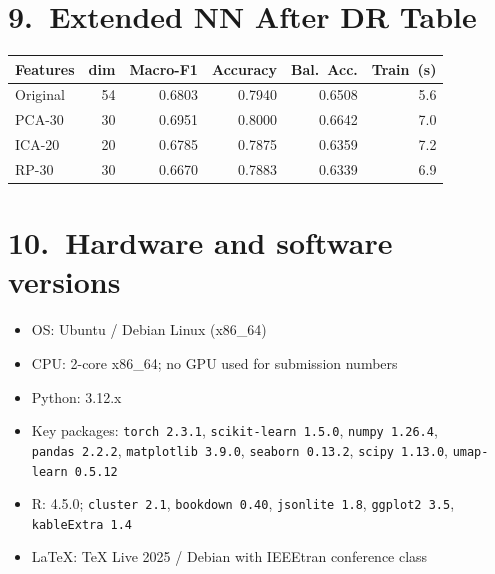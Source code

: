 \documentclass[11pt]{article}
\begin{document}
\section*{9.\ Extended NN After DR Table}

\begin{center}
\small
\begin{tabular}{lrrrrr}
\toprule
\textbf{Features} & \textbf{dim} & \textbf{Macro-F1} &
\textbf{Accuracy} & \textbf{Bal.~Acc.} & \textbf{Train~(s)} \\
\midrule
Original & 54 & 0.6803 & 0.7940 & 0.6508 & 5.6 \\
PCA-30   & 30 & 0.6951 & 0.8000 & 0.6642 & 7.0 \\
ICA-20   & 20 & 0.6785 & 0.7875 & 0.6359 & 7.2 \\
RP-30    & 30 & 0.6670 & 0.7883 & 0.6339 & 6.9 \\
\bottomrule
\end{tabular}
\end{center}

\section*{10.\ Hardware and software versions}
\begin{itemize}[nosep]
  \item OS: Ubuntu / Debian Linux (x86\_64)
  \item CPU: 2-core x86\_64; no GPU used for submission numbers
  \item Python: 3.12.x
  \item Key packages: \texttt{torch~2.3.1}, \texttt{scikit-learn~1.5.0},
        \texttt{numpy~1.26.4}, \texttt{pandas~2.2.2},
        \texttt{matplotlib~3.9.0}, \texttt{seaborn~0.13.2},
        \texttt{scipy~1.13.0}, \texttt{umap-learn~0.5.12}
  \item R: 4.5.0; \texttt{cluster~2.1}, \texttt{bookdown~0.40},
        \texttt{jsonlite~1.8}, \texttt{ggplot2~3.5}, \texttt{kableExtra~1.4}
  \item \LaTeX: TeX Live 2025 / Debian with IEEEtran conference class
\end{itemize}
\end{document}

